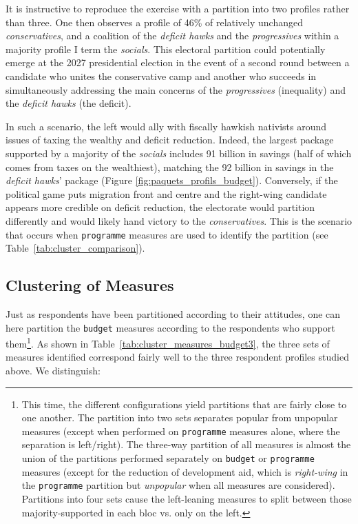 \documentclass[12pt,english]{article}
\newcommand{\blue}[1]{\textcolor{blue!60!black}{#1}}
\begin{document}
\blue{It is instructive to reproduce the exercise with a partition into two profiles rather than three. One then observes a profile of 46\% of relatively unchanged \textit{conservatives}, and a coalition of the \textit{deficit hawks} and the \textit{progressives} within a majority profile I term the \textit{socials}. This electoral partition could potentially emerge at the 2027 presidential election in the event of a second round between a candidate who unites the conservative camp and another who succeeds in simultaneously addressing the main concerns of the \textit{progressives} (inequality) and the \textit{deficit hawks} (the deficit).}

In such a scenario, the left would ally with fiscally hawkish nativists around issues of taxing the wealthy and deficit reduction. Indeed, the largest package supported by a majority of the \textit{socials} includes 91 billion in savings (half of which comes from taxes on the wealthiest), matching the 92 billion in savings in the \textit{deficit hawks}' package (Figure \ref{fig:paquets_profils_budget}). \blue{Conversely, if the political game puts migration front and centre and the right-wing candidate appears more credible on deficit reduction, the electorate would partition differently and would likely hand victory to the \textit{conservatives}.}
This is the scenario that occurs when \texttt{programme} measures are used to identify the partition (see Table~\ref{tab:cluster_comparison}).


\subsection{Clustering of Measures}

Just as respondents have been partitioned according to their attitudes, one can here partition the \texttt{budget} measures according to the respondents who support them\footnote{This time, the different configurations yield partitions that are fairly close to one another. The partition into two sets separates popular from unpopular measures (except when performed on \texttt{programme} measures alone, where the separation is left/right). The three-way partition of all measures is almost the union of the partitions performed separately on \texttt{budget} or \texttt{programme} measures (except for the reduction of development aid, which is \textit{right-wing} in the \texttt{programme} partition but \textit{unpopular} when all measures are considered). Partitions into four sets cause the left-leaning measures to split between those majority-supported in each bloc vs. only on the left.}.
As shown in Table~\ref{tab:cluster_measures_budget3}, \blue{the three sets of measures identified correspond fairly well to the three respondent profiles studied above}. We distinguish:
\end{document}
